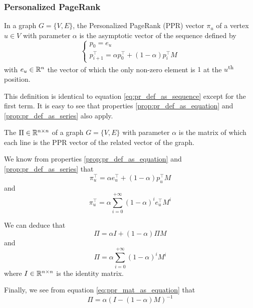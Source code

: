 \subsubsection{Personalized PageRank}
In a graph $G = \{V, E\}$, the Personalized PageRank (PPR) vector $\pi_u$ of a vertex $u \in V$ with parameter $\alpha$ is the asymptotic vector of the sequence defined by 
\begin{equation}\label{eq:ppr_def_as_sequence}
    \begin{cases}
        p_0 = e_u\\
        p_{i+1}^\top = \alpha p_0^\top + (1-\alpha)p_i^\top M
    \end{cases}
\end{equation}
with $e_u \in \mathbb{R}^n$ the vector of which the only non-zero element is $1$ at the $u$\textsuperscript{th} position.

This definition is identical to equation \ref{eq:pr_def_as_sequence} except for the first term. It is easy to see that properties \ref{prop:pr_def_as_equation} and \ref{prop:pr_def_as_series} also apply.

\begin{definition}
    The  $\Pi \in \mathbb{R}^{n \times n}$ of a graph $G = \{V, E\}$ with parameter $\alpha$ is the matrix of which each line is the PPR vector of the related vector of the graph.
\end{definition}

We know from properties \ref{prop:pr_def_as_equation} and \ref{prop:pr_def_as_series} that
\begin{equation*}
    \pi_u^\top = \alpha e_u^\top + (1-\alpha) p_u^\top M
\end{equation*}
and
\begin{equation*}
    \pi_u^\top = \alpha \sum_{i=0}^{+\infty} (1-\alpha)^i e_u^\top M^i
\end{equation*}

We can deduce that
\begin{equation}\label{eq:ppr_mat_as_equation}
    \Pi = \alpha I + (1-\alpha)\Pi M
\end{equation}
and
\begin{equation}\label{eq:ppr_mat_as_series}
    \Pi = \alpha \sum_{i=0}^{+\infty} (1-\alpha)^i M^i
\end{equation}
where $I\in \mathbb{R}^{n\times n}$ is the identity matrix.

Finally, we see from equation \ref{eq:ppr_mat_as_equation} that 
\begin{equation} \label{eq:ppr_mat_as_inverse}
    \Pi = \alpha (I - (1-\alpha)M)^{-1}
\end{equation}

